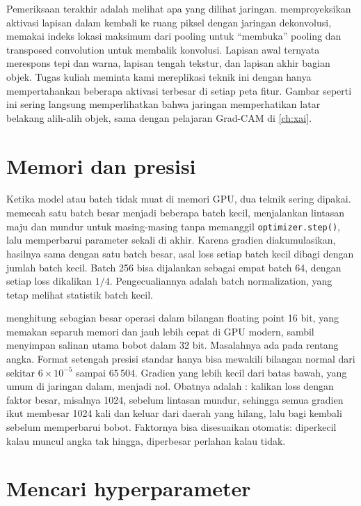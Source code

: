 Pemeriksaan terakhir adalah melihat apa yang dilihat jaringan. \citet{zeiler2014} memproyeksikan aktivasi lapisan dalam kembali
ke ruang piksel dengan jaringan dekonvolusi, memakai indeks lokasi maksimum dari pooling untuk ``membuka'' pooling dan
transposed convolution untuk membalik konvolusi. Lapisan awal ternyata merespons tepi dan warna, lapisan tengah tekstur, dan
lapisan akhir bagian objek. Tugas kuliah meminta kami mereplikasi teknik ini dengan hanya mempertahankan beberapa aktivasi
terbesar di setiap peta fitur. Gambar seperti ini sering langsung memperlihatkan bahwa jaringan memperhatikan latar belakang
alih-alih objek, sama dengan pelajaran Grad-CAM di \cref{ch:xai}.

\section{Memori dan presisi}

Ketika model atau batch tidak muat di memori GPU, dua teknik sering dipakai.  memecah satu batch
besar menjadi beberapa batch kecil, menjalankan lintasan maju dan mundur untuk masing-masing tanpa memanggil
\texttt{optimizer.step()}, lalu memperbarui parameter sekali di akhir. Karena gradien diakumulasikan, hasilnya sama dengan satu
batch besar, asal loss setiap batch kecil dibagi dengan jumlah batch kecil. Batch 256 bisa dijalankan sebagai empat batch 64,
dengan setiap loss dikalikan $1/4$. Pengecualiannya adalah batch normalization, yang tetap melihat statistik batch kecil.

 \citep{micikevicius2018} menghitung sebagian besar operasi dalam bilangan floating point 16 bit, yang
memakan separuh memori dan jauh lebih cepat di GPU modern, sambil menyimpan salinan utama bobot dalam 32 bit. Masalahnya ada
pada rentang angka. Format setengah presisi standar hanya bisa mewakili bilangan normal dari sekitar $6\times10^{-5}$ sampai
$65\,504$. Gradien yang lebih kecil dari batas bawah, yang umum di jaringan dalam, menjadi nol. Obatnya adalah : kalikan loss dengan faktor besar, misalnya 1024, sebelum lintasan mundur, sehingga semua gradien ikut membesar
1024 kali dan keluar dari daerah yang hilang, lalu bagi kembali sebelum memperbarui bobot. Faktornya bisa disesuaikan otomatis:
diperkecil kalau muncul angka tak hingga, diperbesar perlahan kalau tidak.

\section{Mencari hyperparameter}


